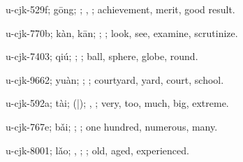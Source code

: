 \begin{multicols}{2}
{\cjkgGlue{}u-cjk-529f; gōng; \cjkgGlue{}; \cjkgGlue{}, \cjkgGlue{}; achievement, merit, good result.

\cjkgGlue{}u-cjk-770b; kàn, kān; \cjkgGlue{}\cjkgGlue{}\cjkgGlue{}; \cjkgGlue{}; look, see, examine, scrutinize.

\cjkgGlue{}u-cjk-7403; qiú; \cjkgGlue{}; \cjkgGlue{}; ball, sphere, globe, round.

\cjkgGlue{}u-cjk-9662; yuàn; \cjkgGlue{}; \cjkgGlue{}; courtyard, yard, court, school.

\cjkgGlue{}u-cjk-592a; tài; \cjkgGlue{}\cjkgGlue{}(\cjkgGlue{}|\cjkgGlue{}); \cjkgGlue{}, \cjkgGlue{}; very, too, much, big, extreme.

\cjkgGlue{}u-cjk-767e; bǎi; \cjkgGlue{}; \cjkgGlue{}; one hundred, numerous, many.

\cjkgGlue{}u-cjk-8001; lǎo; \cjkgGlue{}\cjkgGlue{}\cjkgGlue{}, \cjkgGlue{}\cjkgGlue{}\cjkgGlue{}; \cjkgGlue{}; old, aged, experienced.

}
\end{multicols}
